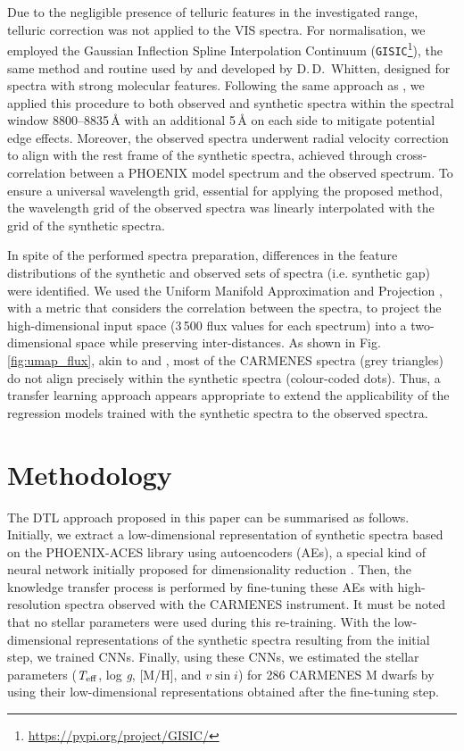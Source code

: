 Due to the negligible presence of telluric features in the investigated range, telluric correction was not applied to the VIS spectra.
For normalisation, we employed the Gaussian Inflection Spline Interpolation Continuum ({\tt GISIC}\footnote{\url{https://pypi.org/project/GISIC/}}), the same method and routine used by  and developed by D.\,D.~Whitten, designed for spectra with strong molecular features.
Following the same approach as , we applied this procedure to both observed and synthetic spectra within the spectral window 8800--8835\,\AA{} with an additional 5\,\AA{} on each side to mitigate potential edge effects. Moreover, the observed spectra underwent radial velocity correction to align with the rest frame of the synthetic spectra, achieved through cross-correlation \citep[\texttt{crosscorrRV} from PyAstronomy,][]{Czesla2019} between a PHOENIX model spectrum and the observed spectrum. To ensure a universal wavelength grid, essential for applying the proposed method, the wavelength grid of the observed spectra was linearly interpolated with the grid of the synthetic spectra.

In spite of the performed spectra preparation, differences in the feature distributions of the synthetic and observed sets of spectra (i.e. synthetic gap) were identified. We used the Uniform Manifold Approximation and Projection \citep[UMAP;][]{McInnes2018}, with a metric that considers the correlation between the spectra, to project the high-dimensional input space (3\,500 flux values for each spectrum) into a two-dimensional space while preserving inter-distances. As shown in Fig. \ref{fig:umap_flux}, akin to  and , most of the CARMENES spectra (grey triangles) do not align precisely within the synthetic spectra (colour-coded dots). Thus, a transfer learning approach appears appropriate to extend the applicability of the regression models trained with the synthetic spectra to the observed spectra.



\section{Methodology} \label{acs_sec:methodology}

The DTL approach proposed in this paper can be summarised as follows. Initially, we extract a low-dimensional representation of synthetic spectra based on the PHOENIX-ACES library using autoencoders (AEs), a special kind of neural network initially proposed for dimensionality reduction \citep{hinton2006b}. Then, the knowledge transfer process is performed by fine-tuning these AEs with high-resolution spectra observed with the CARMENES instrument. It must be noted that no stellar parameters were used during this re-training. With the low-dimensional representations of the synthetic spectra resulting from the initial step, we trained CNNs. Finally, using these CNNs, we estimated the stellar parameters ($\textit{T}_{\rm eff}$, log \textit{g}, [M/H], and $\textit{v}\sin{i}$) for 286 CARMENES M dwarfs by using their low-dimensional representations obtained after the fine-tuning step.


